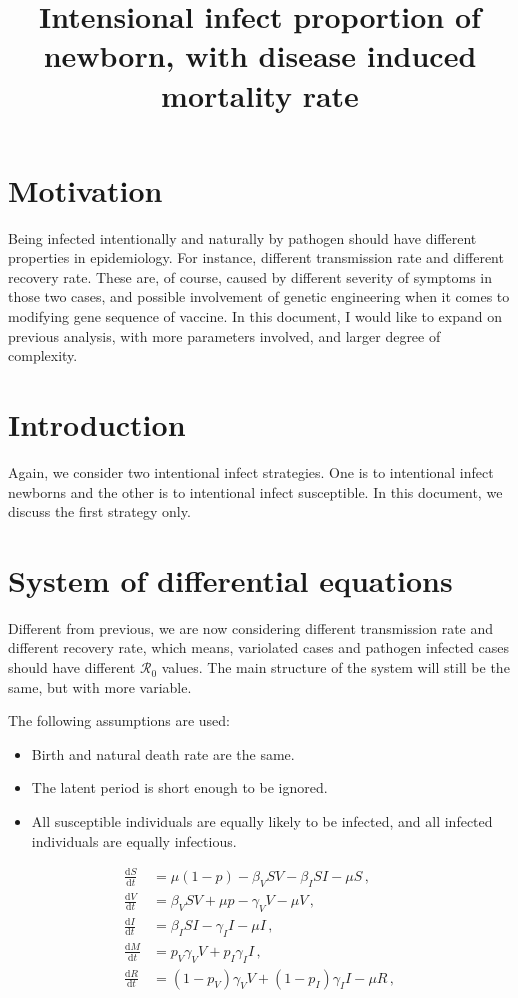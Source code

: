 \documentclass[12pt]{article}
\title{Intensional infect proportion of newborn, with disease induced mortality rate}
\newcommand\dbyd[2]{\frac{\mathrm d{#1}}{\mathrm d{#2}}}
\newcommand{\R}{\mathcal{R}}
\newcommand{\pmV}{p_{V}}
\newcommand{\pmI}{p_{I}}
\begin{document}
\linenumbers
\maketitle

\section{Motivation}

 Being infected intentionally and naturally by pathogen should have different properties in epidemiology. For instance, different transmission rate and different recovery rate. These are, of course, caused by different severity of symptoms in those two cases, and possible involvement of genetic engineering when it comes to modifying gene sequence of vaccine. In this document, I would like to expand on previous analysis, with more parameters involved, and larger degree of complexity.

\section{Introduction}

Again, we consider two intentional infect strategies. One is to intentional infect newborns and the other is to intentional infect susceptible. In this document, we discuss the first strategy only.

\section{System of differential equations}
Different from previous, we are now considering different transmission rate and different recovery rate, which means, variolated cases and pathogen infected cases should have different $\R_0$ values. The main structure of the system will still be the same, but with more variable.

The following assumptions are used:

\begin{itemize}
\item Birth and natural death rate are the same.
\item The latent period is short enough to be ignored.
\item All susceptible individuals are equally likely to be infected, and all infected individuals are equally infectious.
\end{itemize}

\begin{equation}\label{1}
\begin{split}
\dbyd{S}{t}&=\mu(1-p)- \beta_V SV -\beta_I SI-\mu S \,,\\
\dbyd{V}{t}&=\beta_V SV+\mu p-\gamma_V V -\mu V\,,\\
\dbyd{I}{t}&=\beta_I SI-\gamma_I I -\mu I\,,\\
\dbyd{M}{t}&=\pmV\gamma_V V+\pmI\gamma_I I\,,\\
\dbyd{R}{t}&=(1-\pmV)\gamma_V V+(1-\pmI)\gamma_I I-\mu R\,,
\end{split}
\end{equation}
\end{document}

